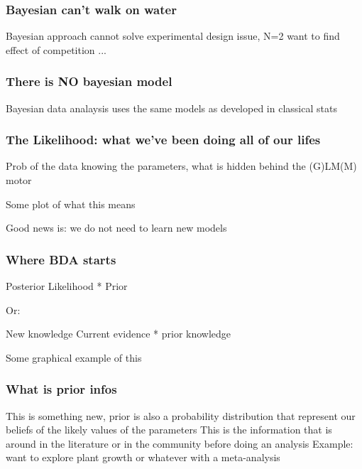 \documentclass{beamer}
\begin{document}
 \begin{frame}
  \frametitle{\bf Bayesian can't walk on water}
  
  Bayesian approach cannot solve experimental design issue, N=2 want to find effect of competition ...
  
 \end{frame}
 
 \begin{frame}
  \frametitle{\bf There is NO bayesian model}
  
  Bayesian data analaysis uses the same models as developed in classical stats
  
 \end{frame}
 
 \begin{frame}
  \frametitle{\bf The Likelihood: what we've been doing all of our lifes}
  
  Prob of the data knowing the parameters, what is hidden behind the (G)LM(M) motor
  
  Some plot of what this means  
  
  Good news is: we do not need to learn new models
  
 \end{frame}
 
 \begin{frame}
  \frametitle{\bf Where BDA starts}
  
  Posterior \propto Likelihood * Prior
  
  Or:
  
  New knowledge \propto Current evidence * prior knowledge
  
  Some graphical example of this
  
 \end{frame}

   \begin{frame}
  \frametitle{\bf What is prior infos}
  
  This is something new, prior is also a probability distribution that represent our beliefs of the likely values of the parameters
  This is the information that is around in the literature or in the community before doing an analysis
  Example: want to explore plant growth or whatever with a meta-analysis
  
 \end{frame}
 
\end{document}
